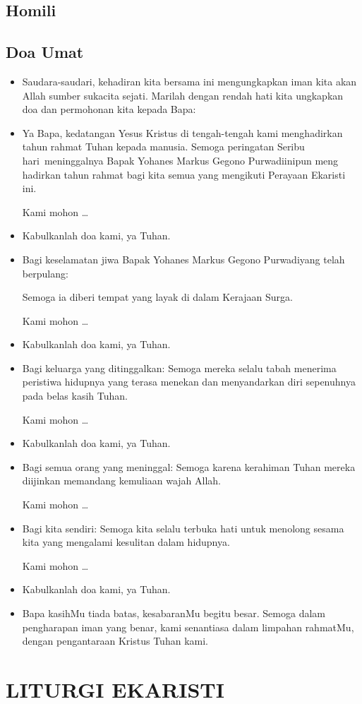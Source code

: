 \documentclass[a5paper,headsepline,titlepage,12pt,nnormalheadings,DIVcalc,twoside]{scrbook}
\newcommand{\BU}[1]{\begin{itemize} \item[U:] #1 \end{itemize}}
\newcommand{\BI}[1]{\begin{itemize} \item[I:] #1 \end{itemize}}
\newcommand{\BP}[1]{\begin{itemize} \item[P:] #1 \end{itemize}}
\newcommand{\namaalm}{Bapak Yohanes Markus Gegono Purwadi}
\newcommand{\Peringatan}{Seribu hari}
\begin{document}
\subsection*{Homili}
\subsection*{Doa Umat}

\BI{Saudara-saudari, kehadiran kita bersama ini mengungkapkan iman kita akan Allah sumber sukacita sejati. Marilah dengan rendah hati kita ungkapkan doa dan permohonan kita kepada Bapa:}

\BP{Ya Bapa, kedatangan Yesus Kristus di tengah-tengah kami menghadirkan tahun rahmat Tuhan kepada manusia. Semoga peringatan \Peringatan ~meninggalnya \namaalm inipun meng
hadirkan tahun rahmat bagi kita semua yang mengikuti Perayaan Ekaristi ini.

Kami mohon \dots}

\BU{Kabulkanlah doa kami, ya Tuhan.}

\BP{Bagi keselamatan jiwa \namaalm yang telah berpulang: 

Semoga ia diberi tempat yang layak di dalam Kerajaan Surga.

Kami mohon \dots}

\BU{Kabulkanlah doa kami, ya Tuhan.}

\BP{Bagi keluarga yang ditinggalkan: Semoga mereka selalu tabah menerima peristiwa hidupnya yang terasa menekan dan menyandarkan diri sepenuhnya pada belas kasih Tuhan.

Kami mohon \dots}

\BU{Kabulkanlah doa kami, ya Tuhan.}

\BP{Bagi semua orang yang meninggal: Semoga karena kerahiman Tuhan mereka diijinkan memandang kemuliaan wajah Allah.

Kami mohon \dots}

\BP{Bagi kita sendiri: Semoga kita selalu terbuka hati untuk menolong sesama kita yang mengalami kesulitan dalam hidupnya.

Kami mohon \dots}

\BU{Kabulkanlah doa kami, ya Tuhan.}

\BI{Bapa kasihMu tiada batas, kesabaranMu begitu besar. Semoga dalam pengharapan iman yang benar, kami senantiasa dalam limpahan rahmatMu, dengan pengantaraan Kristus Tuhan kami.}

\section*{LITURGI EKARISTI}
\end{document}
